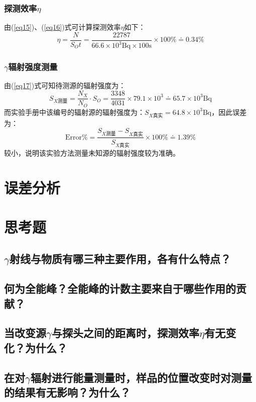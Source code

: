 \documentclass[a4paper]{article}
\begin{document}
\subsubsection{探测效率$\eta$}
由(\ref{eq15})、(\ref{eq16})式可计算探测效率$\eta$如下：
\begin{equation}
\eta = \frac{N}{S_Ot} = \frac{22787}{66.6\times 10^3\text{Bq} \times 100\text{s}}\times 100\% \doteq 0.34\%\label{eta}
\end{equation}
\subsubsection{$\gamma$辐射强度测量}
由(\ref{eq17})式可知待测源的辐射强度为：
\begin{equation}
S_{X\text{测量}} = \frac{N_X}{N_O}\cdot S_O = \frac{3348}{4031}\times 79.1\times 10^3 \doteq 65.7\times 10^3\text{Bq}\label{S_X}
\end{equation}
而实验手册中该编号的辐射源的辐射强度为：$S_{X\text{真实}} = 64.8\times 10^3\text{Bq}$，因此误差为：
\begin{equation}
\text{Error\%} = \frac{S_{X\text{测量}} - S_{X\text{真实}}}{S_{X\text{真实}}}\times 100\% \doteq 1.39\%\label{error}
\end{equation}
较小，说明该实验方法测量未知源的辐射强度较为准确。

\section{误差分析}

\section{思考题}
\subsection{$\gamma$射线与物质有哪三种主要作用，各有什么特点？}
\subsection{何为全能峰？全能峰的计数主要来自于哪些作用的贡献？}
\subsection{当改变源$\gamma$与探头之间的距离时，探测效率$\eta$有无变化？为什么？}
\subsection{在对$\gamma$辐射进行能量测量时，样品的位置改变时对测量的结果有无影响？为什么？}

\nocite{jiaocai}

\end{document}
